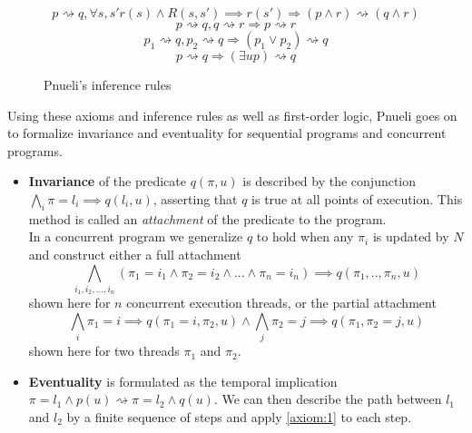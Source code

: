 \documentclass{uit-thesis}
\newcommand{\eventually}{\rightsquigarrow}
\begin{document}
\begin{figure}[h]
    \begin{equation}\tag{R1}\label{rules:1}
        p \eventually q, \forall s, s' r(s) \land R(s,s') \implies r(s') \Rightarrow (p \land r) \eventually (q \land r)
    \end{equation}
    \begin{equation}\tag{R2}\label{rules:2}
        p \eventually q, q \eventually r \Rightarrow p \eventually r
    \end{equation}
    \begin{equation}\tag{R3}\label{rules:3}
        p_1 \eventually q, p_2 \eventually q \Rightarrow (p_1 \lor p_2) \eventually q
    \end{equation}
    \begin{equation}\tag{R4}\label{rules:4}
        p \eventually q \Rightarrow (\exists u p) \eventually q
    \end{equation}
\caption{Pnueli's inference rules}
\end{figure}

Using these axioms and inference rules as well as first-order logic, Pnueli goes on to formalize invariance and eventuality for sequential programs and concurrent programs.

\begin{itemize}[label={}]
    \item \textbf{Invariance} of the predicate $q(\pi, u)$ is described by the conjunction $\bigwedge\limits_{i}{\pi=l_i \implies q(l_i, u)}$, asserting that $q$ is true at all points of execution. This method is called an \textit{attachment} of the predicate to the program.\\
    In a concurrent program we generalize $q$ to hold when any $\pi_i$ is updated by $N$ and construct either a full attachment
    $$\bigwedge\limits_{i_1, i_2,...,i_n}{(\pi_1 = i_1 \land \pi_2 = i_2 \land ... \land \pi_n = i_n) \implies q(\pi_1,..,\pi_n,u)}$$ shown here for $n$ concurrent execution threads,
    or the partial attachment
    $$\bigwedge\limits_{i}{\pi_1=i \implies q(\pi_1 = i, \pi_2, u)} \land \bigwedge\limits_{j}{\pi_2=j \implies q(\pi_1, \pi_2 = j, u)}$$ shown here for two threads $\pi_1$ and $\pi_2$.
    \item \textbf{Eventuality} is formulated as the temporal implication $\pi = l_1 \land p(u) \eventually \pi=l_2 \land q(u)$. We can then describe the path between $l_1$ and $l_2$ by a finite sequence of steps and apply \ref{axiom:1} to each step.
\end{itemize}
\end{document}
